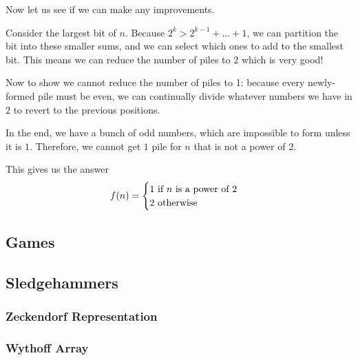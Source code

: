 \documentclass[11pt]{scrartcl}
\theoremstyle{plain} %
\theoremstyle{definition}
\theoremstyle{remark}
\theoremstyle{empty}
\theoremstyle{empty}
\theoremstyle{empty}
\theoremstyle{empty}
\theoremstyle{empty}
\theoremstyle{empty}
\begin{document}
\begin{minipage}{0.5\textwidth}
\end{minipage}

Now let us see if we can make any improvements. 

Consider the largest bit of $n$. Because $2^k > 2^{k-1}+\ldots + 1$, we can partition the bit into these smaller sums, and we can select which ones to add to the smallest bit. This means we can reduce the number of piles to $2$ which is very good!

Now to show we cannot reduce the number of piles to 1: because every newly-formed pile must be even, we can continually divide whatever numbers we have in $2$ to revert to the previous positions. 

In the end, we have a bunch of odd numbers, which are impossible to form unless it is $1$. Therefore, we cannot get $1$ pile for $n$ that is not a power of $2$.

This gives us the answer \[f(n) = \begin{cases}
    1 \text{ if $n$ is a power of $2$} \\ $2$ \text{ otherwise}
\end{cases}\]



\subsection{Games}

\subsection{Sledgehammers}

\subsubsection{Zeckendorf Representation}

\subsubsection{Wythoff Array}

\subsubsection{}
\end{document}
